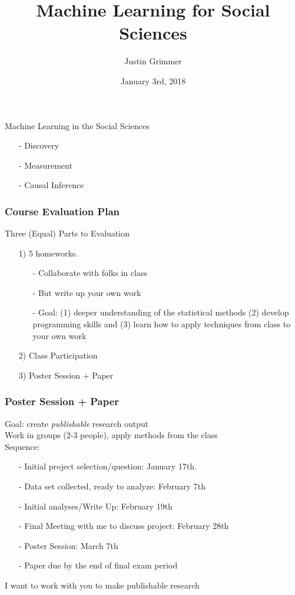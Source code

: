 \documentclass{beamer}
\title[Machine Learning] %
{Machine Learning for Social Sciences}
\author{Justin Grimmer}
\institute[University of Chicago]{Associate Professor\\Department of Political Science \\  University of Chicago}
\date{January 3rd, 2018}
\numberwithin{equation}{section}
\begin{document}
\begin{frame}
\titlepage
\end{frame}





\begin{frame}

\huge 

Machine Learning in the Social Sciences 

\begin{itemize}
\item[-] Discovery 
\item[-] Measurement
\item[-] Causal Inference
\end{itemize}  

\end{frame}


\begin{frame}
\frametitle{Course Evaluation Plan}

Three (Equal) Parts to Evaluation 

\begin{itemize}
  \item[1)] 5 homeworks. 
  \begin{itemize}
    \item[-] Collaborate with folks in class
    \item[-] But write up your own work
    \item[-] Goal: (1) deeper understanding of the statistical methods (2) develop programming skills and (3) learn how to apply techniques from class to your own work
  \end{itemize}
  \item[2)] Class Participation 
  \item[3)] Poster Session + Paper
\end{itemize}  


\end{frame}


\begin{frame}
\frametitle{Poster Session + Paper}

Goal: create \emph{publishable} research output\\
Work in groups (2-3 people), apply methods from the class \\
Sequence:
\begin{itemize}
\item[-] Initial project selection/question: January 17th.  
\item[-] Data set collected, ready to analyze: February 7th
\item[-] Initial analyses/Write Up: February 19th
\item[-] Final Meeting with me to discuss project:  February 28th
\item[-] \alert{Poster Session}: March 7th
\item[-] Paper due by the end of final exam period
\end{itemize} 


\alert{I want to work with you to make publishable research}



\end{frame}
\end{document}
